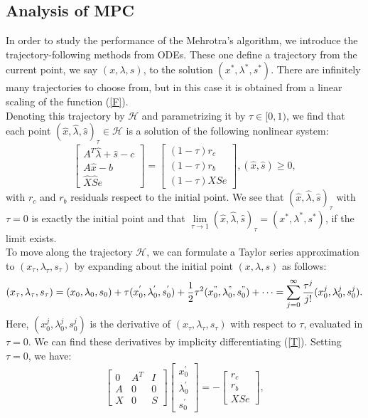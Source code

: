 \documentclass[a4paper,10 pt,titlepage,twoside]{book}
\theoremstyle{plain}
\theoremstyle{definition}
\theoremstyle{remark}
\begin{document}
\subsection*{Analysis of MPC}
In order to study the performance of the Mehrotra's algorithm, we introduce the trajectory-following methods from ODEs. These one define a trajectory from the current point, we say $(x,\lambda,s)$, to the solution $(x^{*},\lambda^{*},s^{*})$. There are infinitely many trajectories to choose from, but in this case it is obtained from a linear scaling of the function (\ref{F}).\\ Denoting this trajectory by $\mathcal{H}$ and parametrizing it by $\tau\in[0,1)$, we find that each point $(\hat{x},\hat{\lambda},\hat{s})_{\tau}\in\mathcal{H}$ is a solution of the following nonlinear system:
\begin{equation}\label{T}
\begin{bmatrix}
A^{T}\hat{\lambda}+\hat{s}-c \\A\hat{x}-b \\\hat{X}\hat{S}e
\end{bmatrix}=\begin{bmatrix}
(1-\tau)r_{c}\\(1-\tau)r_{b}\\(1-\tau)XSe
\end{bmatrix}, (\hat{x},\hat{s})\geq0,
\end{equation}
with $r_{c}$ and $r_{b}$ residuals respect to the initial point. We see that $(\hat{x},\hat{\lambda},\hat{s})_{\tau}$ with $\tau = 0$ is exactly the initial point and that $\lim\limits_{\tau\to1}(\hat{x},\hat{\lambda},\hat{s})_{\tau} = (x^{*},\lambda^{*},s^{*})$, if the limit exists.\\
To move along the trajectory $\mathcal{H}$, we can formulate a Taylor series approximation to $(x_{\tau},\lambda_{\tau},s_{\tau})$ by expanding about the initial point  $(x,\lambda,s)$ as follows:
\begin{equation*}
(x_{\tau},\lambda_{\tau},s_{\tau})=(x_{0},\lambda_{0},s_{0})+\tau(x_{0}^{'},\lambda_{0}^{'},s_{0}^{'})+\frac{1}{2}\tau^{2}(x_{0}^{"},\lambda_{0}^{"},s_{0}^{"})+\dots = \sum_{j=0}^{\infty}\frac{\tau^{j}}{j!}(x_{0}^{j},\lambda_{0}^{j},s_{0}^{j}).
\end{equation*}
Here, $(x_{0}^{j},\lambda_{0}^{j},s_{0}^{j})$ is the derivative of $(x_{\tau},\lambda_{\tau},s_{\tau})$ with respect to $\tau$, evaluated in $\tau = 0$. We can find these derivatives by implicity differentiating (\ref{T}). Setting $\tau=0$, we have:
\begin{equation*}
\begin{bmatrix}
0&A^{T}&I \\A&0&0\\X&0&S
\end{bmatrix}\begin{bmatrix}
x_{0}^{'}\\\lambda_{0}^{'}\\s_{0}^{'}
\end{bmatrix}=-\begin{bmatrix}
r_{c}\\r_{b}\\XSe
\end{bmatrix},
\end{equation*}
\end{document}
